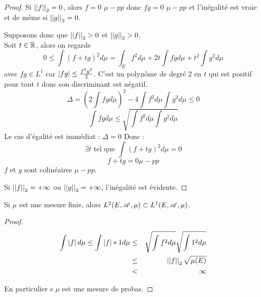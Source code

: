 \begin{proof}
	Si $\left|\left|f\right|\right|_2 = 0$, alors $f = 0$ $\mu-pp$ donc $fg = 0$ $\mu-pp$ et l'inégalité est vraie et de
	même si $\left|\left|g\right|\right|_2 = 0$.

	Supposons donc que $\left|\left|f\right|\right|_2 > 0$ et $\left|\left|g\right|\right|_2 > 0$.\\
	Soit $t \in \mathbb{R}$, alors on regarde
	$$ 0 \leq \int (f + tg)^2 d \mu = \int_E f^2 d \mu + 2t \int fg d \mu + t^2 \int g^2 d \mu$$
	avec $fg \in L^1$ car $\left|fg\right| \leq \frac{f^2g^2}{2}$.
	C'est un polynôme de degré 2 en $t$ qui est positif pour tout $t$ donc son discriminant est négatif.
	$$  \Delta = (2 \int fg d \mu)^2 - 4 \int f^2 d \mu \int g^2 d \mu \leq 0$$
	$$ \int fg d \mu \leq \sqrt{\int f^2 d \mu \int g^2 d \mu}$$
	Le cas d'égalité est immédiat : $\Delta = 0$ Donc :
	$$\exists t \text { tel que } \int (f + tg)^2 d \mu  = 0$$
	$$ f + tg = 0 \mu-pp$$
	$f$ et $g$ sont colinéaires $\mu-pp$.

	Si $\left|\left|f\right|\right|_2 = +  \infty$ ou $\left|\left|g\right|\right|_2 = +  \infty$, l'inégalité est évidente.
\end{proof}

\begin{coro}
	Si $\mu$ est une mesure finie, alors $L^2(E, \mathscr{A}, \mu) \subset L^1(E, \mathscr{A}, \mu)$.
\end{coro}

\begin{proof}
	\begin{eqnarray*}
		\int \left|f\right| d \mu \leq \int \left|f\right|*1 d \mu &\leq& \sqrt{\int f^2 d \mu} \sqrt{\int 1^2 d \mu} \\
		& \leq & \left|\left|f\right|\right|_2 \sqrt{\mu(E)} \\
		& < & \infty
	\end{eqnarray*}

	En particulier s $\mu$ est une mesure de probas.
\end{proof}


 
